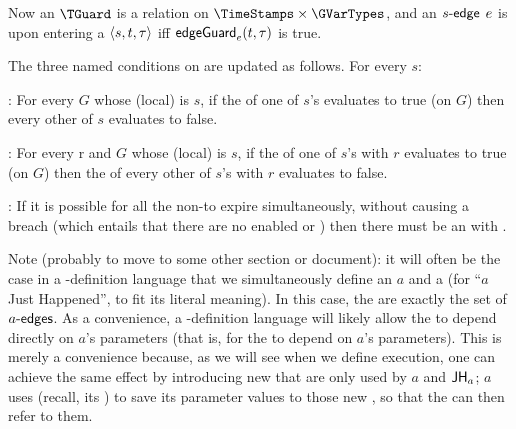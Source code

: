 \documentclass[12pt]{article}
\begin{document}
Now an $\TGuard$ is a relation on $\TimeStamps \times \GVarTypes$, and an $s\textsf{-edge}$ $e$ is  upon entering a \GlobalState $\langle s,t,\tau\rangle$ iff $\textsf{edgeGuard}_{e}(t,\tau)$ is true.


The three named conditions on \TGuards are updated as follows. For every \State $s$:

\noindent {}: For every \GlobalState $G$ whose (local) \State is $s$, if the \TGuard of one of $s$'s \mustntrans evaluates to true (on $G$) then every other \TGuard of $s$ evaluates to false. 
\medskip

\noindent {}: For every \Role r and \GlobalState $G$ whose (local) \State is $s$, if the \TGuard of one of $s$'s \rmustntrans with \Role $r$ evaluates to true (on $G$) then the \TGuard of every other of $s$'s \rmustntrans with \Role $r$ evaluates to false.
\medskip

\noindent {}: If it is possible for all the \enabled non-\Env \transitions to expire simultaneously, without causing a breach (which entails that there are no enabled \mustntrans or \rmustntrans) then there must be an \depTrans{\Env} with \Deadline \nodeadline.




\bigskip

Note (probably to move to some other section or document): it will often be the case in a \Contract-definition language that we simultaneously define an \Action $a$ and a \State {} (for ``$a$ Just Happened'', to fit its literal meaning). In this case, the  are exactly the set of $a\textsf{-edges}$. As a convenience, a \Contract-definition language will likely allow the  to depend directly on $a$'s parameters (that is, for the \TGuard
to depend on $a$'s parameters). This is merely a convenience because, as we will see when we define execution, one can achieve the same effect by introducing new \GVars that are only used by $a$ and $\textsf{JH}_{a}$; $a$ uses  (recall, its \gvTransform) to save its parameter values to those new \GVars, so that the  can then refer to them.
\end{document}
